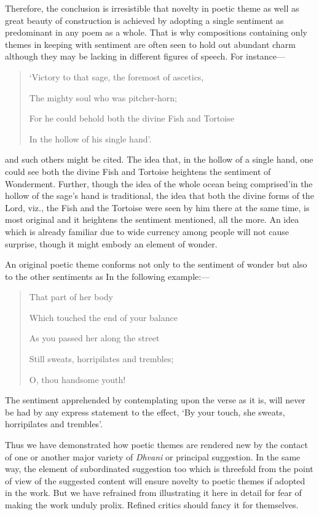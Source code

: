 \documentclass[12pt]{book}
\begin{document}
Therefore, the conclusion is irresistible that novelty in
poetic theme as well as great beauty of construction is achieved
by adopting a single sentiment as predominant in any poem as a
whole. That is why compositions containing only themes in
keeping with sentiment are often seen to hold out abundant
charm although they may be lacking in different figures of
speech. For instance---

\begin{quotation}
\begin{em}
`Victory to that sage, the foremost of ascetics,

The mighty soul who was pitcher-horn;

For he could behold both the divine Fish and Tortoise

In the hollow of his single hand'.
\end{em}
\end{quotation}

and such others might be cited. The idea that, in the hollow
of a single hand, one could see both the divine Fish and Tortoise
heightens the sentiment of Wonderment. Further, though the idea
of the whole ocean being comprised'in the hollow of the sage's
hand is traditional, the idea that both the divine forms of the
Lord, viz., the Fish and the Tortoise were seen by him there
at the same time, is most original and it heightens the sentiment
mentioned, all the more. An idea which is already familiar
due to wide currency among people will not cause surprise,
though it might embody an element of wonder.

An original poetic theme conforms not only to the sentiment
of wonder but also to the other sentiments as In the following
example:---

\begin{quotation}
\begin{em}
That part of her body

Which touched the end of your balance

As you passed her along the street

Still sweats, horripilates and trembles;

O, thou handsome youth!
\end{em}
\end{quotation}

The sentiment apprehended by contemplating upon the
verse as it is, will never be had by any express statement to the
effect, `By your touch, she sweats, horripilates and trembles'.

Thus we have demonstrated how poetic themes are rendered
new by the contact of one or another major variety of \textit{Dhvani}
or principal suggestion. In the same way, the element of subordinated suggestion too which is threefold from the point of
view of the suggested content will ensure novelty to poetic themes
if adopted in the work. But we have refrained from illustrating
it here in detail for fear of making the work unduly prolix.
Refined critics should fancy it for themselves.
\end{document}

